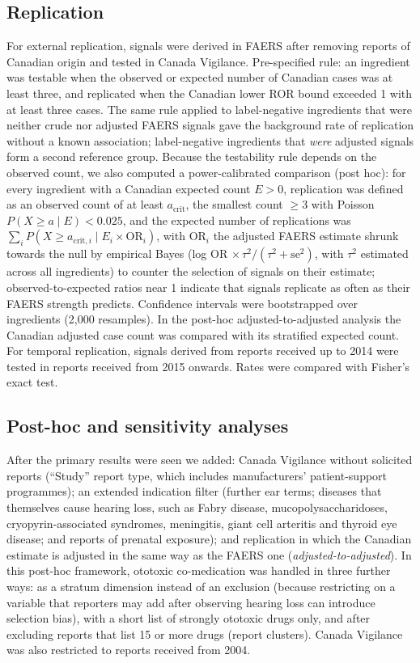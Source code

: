\documentclass[11pt]{article}
\begin{document}
\subsection{Replication}
For external replication, signals were derived in FAERS after removing reports of Canadian origin and tested in Canada
Vigilance. Pre-specified rule: an ingredient was testable when the observed or expected number of Canadian cases was at
least three, and replicated when the Canadian lower ROR bound exceeded 1 with at least three cases. The same rule applied to
label-negative ingredients that were neither crude nor adjusted FAERS signals gave the background rate of replication
without a known association; label-negative ingredients that \emph{were} adjusted signals form a second reference group.
Because the testability rule depends on the observed count, we also computed a power-calibrated comparison (post hoc): for
every ingredient with a Canadian expected count $E>0$, replication was defined as an observed count of at least
$a_{\mathrm{crit}}$, the smallest count $\geq 3$ with Poisson $P(X\geq a\mid E)<0.025$, and the expected number of
replications was $\sum_i P(X\geq a_{\mathrm{crit},i}\mid E_i \times \mathrm{OR}_i)$, with OR$_i$ the adjusted FAERS
estimate shrunk towards the null by empirical Bayes (log OR $\times\,\tau^2/(\tau^2+\mathrm{se}^2)$, with $\tau^2$ estimated
across all ingredients) to counter the selection of signals on their estimate; observed-to-expected ratios near 1 indicate that
signals replicate as often as their FAERS strength predicts. Confidence intervals were bootstrapped over ingredients (2{,}000
resamples). In the post-hoc adjusted-to-adjusted analysis the Canadian adjusted case count was compared with its stratified
expected count. For
temporal replication, signals derived from reports received up to 2014 were tested in reports received from 2015 onwards.
Rates were compared with Fisher's exact test.

\subsection{Post-hoc and sensitivity analyses}
After the primary results were seen we added: Canada Vigilance without solicited reports (``Study'' report type, which
includes manufacturers' patient-support programmes); an extended indication filter (further ear terms; diseases that
themselves cause hearing loss, such as Fabry disease, mucopolysaccharidoses, cryopyrin-associated syndromes, meningitis,
giant cell arteritis and thyroid eye disease; and reports of prenatal exposure); and replication in which the Canadian
estimate is adjusted in the same way as the FAERS one (\emph{adjusted-to-adjusted}). In this post-hoc framework, ototoxic
co-medication was handled in three further ways: as a stratum dimension instead of an exclusion (because restricting on a
variable that reporters may add after observing hearing loss can introduce selection bias), with a short list of strongly
ototoxic drugs only, and after excluding reports that list 15 or more drugs (report clusters). Canada Vigilance was also
restricted to reports received from 2004.
\end{document}
